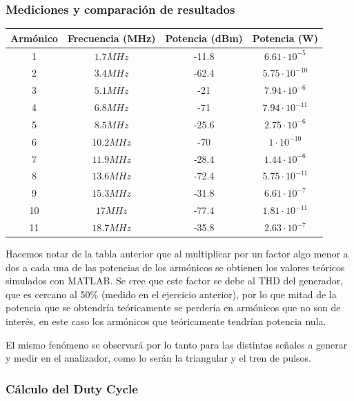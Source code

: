\documentclass[../../labo_tp5_main.tex]{subfiles}
\begin{document}
\subsubsection{Mediciones y comparación de resultados}

\begin{table}[H] %
	\centering
 		\begin{tabular}{||c c c c||} 
 			\hline
			Armónico & Frecuencia (MHz) & Potencia (dBm) & Potencia (W)\\ [0.5ex] 
 			\hline\hline
			1 & $1.7MHz$ & -11.8 & $6.61\cdot 10^{-5}$\\
			2 & $3.4MHz$ & -62.4 & $5.75\cdot 10^{-10}$\\
			3 & $5.1MHz$ & -21 & $7.94\cdot 10^{-6}$\\
			4 & $6.8MHz$ & -71 & $7.94\cdot 10^{-11}$\\
			5 & $8.5MHz$ & -25.6 & $2.75\cdot 10^{-6}$\\
			6 & $10.2MHz$ & -70 & $1\cdot 10^{-10}$\\
			7 & $11.9MHz$ & -28.4 & $1.44\cdot 10^{-6}$\\
			8 & $13.6MHz$ & -72.4 & $5.75\cdot 10^{-11}$\\
			9 & $15.3MHz$ & -31.8 & $6.61\cdot 10^{-7}$\\
			10 & $17MHz$ & -77.4 & $1.81\cdot 10^{-11}$\\
			11 & $18.7MHz$ & -35.8 & $2.63\cdot 10^{-7}$\\[1ex] 
			\hline
		\end{tabular}
\end{table}
Hacemos notar de la tabla anterior que al multiplicar por un factor algo menor a dos a cada una de las potencias de los armónicos se obtienen los valores teóricos simulados con MATLAB. Se cree que este factor se debe al THD del generador, que es cercano al 50\% (medido en el ejercicio anterior), por lo que mitad de la potencia que se obtendría teóricamente se perdería en armónicos que no son de interés, en este caso los armónicos que teóricamente tendrían potencia nula. \par
El mismo fenómeno se observará por lo tanto para las distintas señales a generar y medir en el analizador, como lo serán la triangular y el tren de pulsos.\par

\subsubsection{Cálculo del Duty Cycle}
\end{document}
